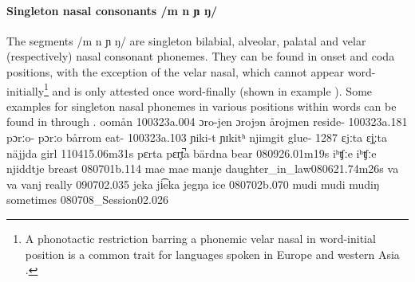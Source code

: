 \paragraph{Singleton nasal consonants /m n ɲ ŋ/}
The segments /m n ɲ ŋ/ are singleton bilabial, alveolar, palatal and velar (respectively) nasal consonant phonemes. 
They can be found in onset and coda positions, with the exception of the velar nasal, which cannot appear word-initially\footnote{A phonotactic restriction barring a phonemic velar nasal in word-initial position is a common trait for languages spoken in Europe and western Asia \citep[cf.][]{Anderson2008WALS}.} and is only attested once word-finally (shown in example ). Some examples for singleton nasal phonemes in various positions within words can be found in  through . %
			{o}{o}{mån}	{}			{100323a}{.004}
		{ɔro-jen}	{ɔrojɘn}	{årojmen}	{reside-}		{100323a}{.181}
				{pɔrːo-\Bf{m}}	{pɔrːo}	{bårrom}	{eat-}			{100323a}{.103}
				{ɲi\Bf{m}ki-t}		{ɲɪkitʰ}	{njimgit}	{glue-}			{1287}
			{\Bf{n}ɛjːta}		{ɛj̥ːta}		{näjjda}	{girl\BS{}}		{110415}{.06m31s}
			{pɛrta}		{pɛr̥t̚a}		{bärdna}	{bear\BS{}}		{080926}{.01m19s}
		{iʰʧːe}		{iʰʧːe}		{njiddtje}	{breast\BS{}}	{080701b}{.114}
	{mae}		{mae}		{manje}	{daughter\_in\_law\BS{}}{080621}{.74m26s}
				{va\Bf{ɲ}}		{va}		{vanj}	{really}					{090702}{.035}
			{jeka}		{ji͡eka}		{jegŋa}	{ice\BS{}}		{080702b}{.070}
	{mudi}		{mudi}		{mudiŋ}	{sometimes}			{080708\_Session02}{.026}%

